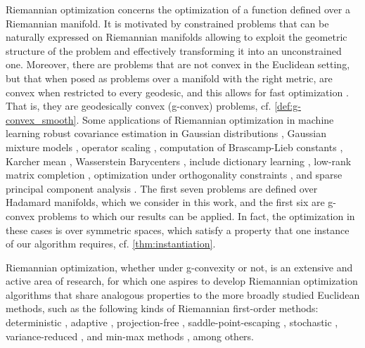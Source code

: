 \documentclass[12pt]{alt2021}
\begin{document}
Riemannian optimization concerns the optimization of a function defined over a Riemannian manifold. It is motivated by constrained problems that can be naturally expressed on Riemannian manifolds allowing to exploit the geometric structure of the problem and effectively transforming it into an unconstrained one. Moreover, there are problems that are not convex in the Euclidean setting, but that when posed as problems over a manifold with the right metric, are convex when restricted to every geodesic, and this allows for fast optimization \citep{neto2006convex, bento2012subgradient, bento2015proximal, allen2018operator}. That is, they are geodesically convex (g-convex) problems, cf. \cref{def:g-convex_smooth}. Some applications of Riemannian optimization in machine learning robust covariance estimation in Gaussian distributions \citep{wiesel2012geodesic}, Gaussian mixture models \citep{hosseini2015matrix}, operator scaling \citep{allen2018operator}, computation of Brascamp-Lieb constants \citep{bennett2008brascamp}, Karcher mean \citep{zhang2016fast}, Wasserstein Barycenters \citep{weber2017frank}, include dictionary learning \citep{cherian2016riemannian,sun2016complete}, low-rank matrix completion \citep{DBLP:journals/siamsc/CambierA16,heidel2018riemannian,mishra2014r3mc,tan2014riemannian,vandereycken2013low}, optimization under orthogonality constraints \citep{edelman1998geometry,DBLP:conf/icml/CasadoM19}, and sparse principal component analysis \citep{genicot2015weakly,huang2019riemannian,jolliffe2003modified}. The first seven problems are defined  over Hadamard manifolds, which we consider in this work, and the first six are g-convex problems to which our results can be applied. In fact, the optimization in these cases is over symmetric spaces, which satisfy a property that one instance of our algorithm requires, cf. \cref{thm:instantiation}. 


Riemannian optimization, whether under g-convexity or not, is an extensive and active area of research, for which one aspires to develop Riemannian optimization algorithms that share analogous properties to the more broadly studied Euclidean methods, such as the following kinds of Riemannian first-order methods: deterministic \citep{bento2017iteration,wei2016guarantees,zhang2016first}, adaptive \citep{kasai2019riemannian}, projection-free \citep{weber2017frank,weber2019nonconvex}, saddle-point-escaping \citep{criscitiello2019efficiently,sun2019escaping,zhou2019faster, criscitiello2020accelerated}, stochastic \citep{hosseini2019alternative,khuzani2017stochastic,tripuraneni2018averaging}, variance-reduced \citep{sato2017riemannian,kasai2018riemannian,zhang2016fast}, and min-max methods \citep{zhang2022minimax, jordan2022first}, among others. 
\end{document}
